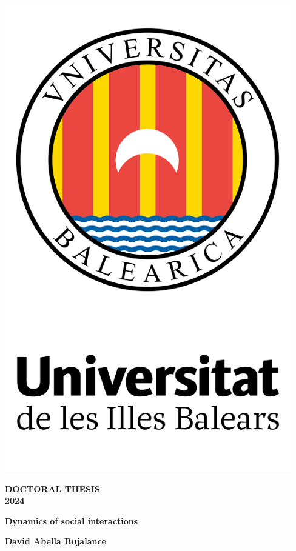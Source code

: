 \begin{titlepage}
    	\large

        \begin{center}
            \sffamily
            \includegraphics[width=.35\textwidth]{Figs/uib.png}
        
            \vspace*{.05\textheight}

			{\Huge\bfseries DOCTORAL THESIS} \\
			{\Large \bfseries 2024}

            \vspace*{.15\textheight}

			\begingroup
				{\Huge\bfseries Dynamics of social interactions \par}
			\endgroup

            \vfill

            {\Large \bfseries David Abella Bujalance}
        \end{center}
\end{titlepage}